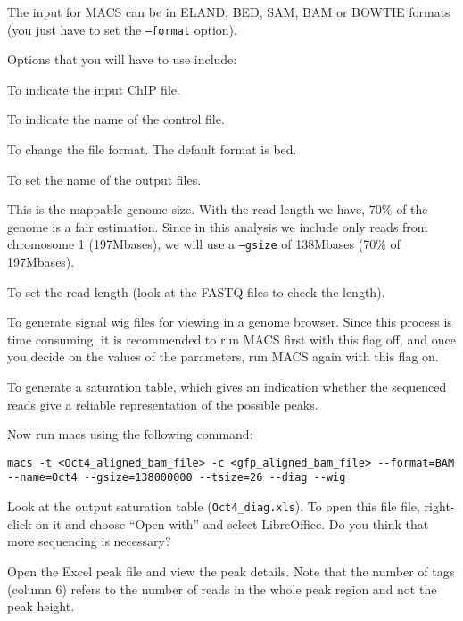 \begin{information}
The input for MACS can be in ELAND, BED, SAM, BAM or BOWTIE formats (you just
have to set the \texttt{--format} option).

Options that you will have to use include: 

\begin{description}[style=multiline,labelindent=0cm,align=right,leftmargin=\descriptionlabelspace,rightmargin=1.5cm,font=\ttfamily]
 \item[-t] To indicate the input ChIP file.
 \item[-c] To indicate the name of the control file.
 \item[--format] To change the file format. The default format is bed.
 \item[--name] To set the name of the output files.
 \item[--gsize] This is the mappable genome size. With the read length we have,
 $70\%$ of the genome is a fair estimation. Since in this analysis we include
 only reads from chromosome 1 (197Mbases), we will use a \texttt{--gsize} of 138Mbases (70\% of 197Mbases).
 \item[--tsize] To set the read length (look at the FASTQ files to check the
 length).
 \item[--wig] To generate signal wig files for viewing in a genome browser.
 Since this process is time consuming, it is recommended to run MACS first with
 this flag off, and once you decide on the values of the parameters, run MACS
 again with this flag on.
 \item[--diag] To generate a saturation table, which gives an indication whether
 the sequenced reads give a reliable representation of the possible peaks.
\end{description}
\end{information}

\begin{steps}
Now run macs using the following command:

\begin{lstlisting}
macs -t <Oct4_aligned_bam_file> -c <gfp_aligned_bam_file> --format=BAM --name=Oct4 --gsize=138000000 --tsize=26 --diag --wig 
\end{lstlisting}

Look at the output saturation table (\texttt{Oct4\_diag.xls}). To open this file
file, right-click on it and choose ``Open with'' and select LibreOffice. Do you think
that more sequencing is necessary?

Open the Excel peak file and view the peak details. Note that the number of tags
(column 6) refers to the number of reads in the whole peak region and not the
peak height.

\end{steps}

